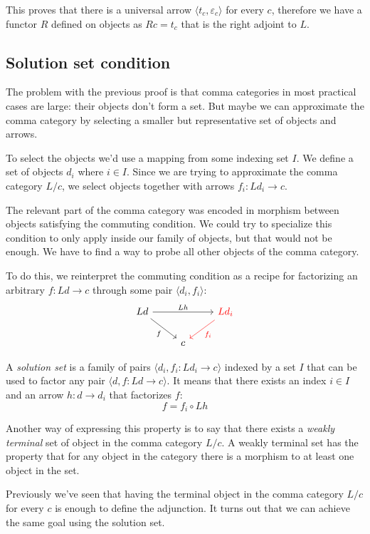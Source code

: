 \documentclass[DaoFP]{subfiles}
\begin{document}
This proves that there is a universal arrow $\langle t_c, \varepsilon_c \rangle$ for every $c$, therefore we have a functor $R$ defined on objects as $R c = t_c$ that is the right adjoint to $L$.

\subsection{Solution set condition}

The problem with the previous proof is that comma categories in most practical cases are large: their objects don't form a set. But maybe we can approximate the comma category by selecting a smaller but representative set of objects and arrows. 

To select the objects we'd use a mapping from some indexing set $I$. We define a set of objects $d_i$ where $i \in I$. Since we are trying to approximate the comma category $L/c$, we select objects together with arrows $f_i \colon L d_i \to c$. 

The relevant part of the comma category was encoded in morphism between objects satisfying the commuting condition. We could try to specialize this condition to only apply inside our family of objects, but that would not be enough. We have to find a way to probe all other objects of the comma category. 

To do this, we reinterpret the commuting condition as a recipe for factorizing an arbitrary $f \colon L d \to c$ through some pair $\langle d_i, f_i \rangle$:
\[
 \begin{tikzcd}
 L d
 \arrow[rd, "f"']
 \arrow[rr, "L h"]
 && \textcolor{red}{L d_i}
 \arrow[ld, red, "f_i"]
 \\
 &c
  \end{tikzcd}
\]

A \emph{solution set} is a family of pairs $\langle d_i, f_i \colon L d_i \to c \rangle $ indexed by a set $I$ that can be used to factor any pair $\langle d, f \colon L d \to c \rangle $. It means that there exists an index $i \in I$ and an arrow $h \colon d \to d_i$ that factorizes $f$:
\[ f = f_i \circ L h \]

Another way of expressing this property is to say that there exists a \emph{weakly terminal} set of object in the comma category $L/c$. A weakly terminal set has the property that for any object in the category there is a morphism to at least one object in the set.

Previously we've seen that having the terminal object in the comma category $L/c$ for every $c$ is enough to define the adjunction. It turns out that we can achieve the same goal using the solution set. 
\end{document}
